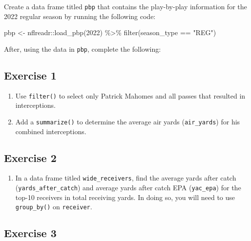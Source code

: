 \documentclass[
  letterpaper,
]{krantz}
\newenvironment{Shaded}{\begin{snugshade}}{\end{snugshade}}
\newcommand{\DecValTok}[1]{\textcolor[rgb]{0.68,0.00,0.00}{#1}}
\newcommand{\FunctionTok}[1]{\textcolor[rgb]{0.28,0.35,0.67}{#1}}
\newcommand{\NormalTok}[1]{\textcolor[rgb]{0.00,0.23,0.31}{#1}}
\newcommand{\OtherTok}[1]{\textcolor[rgb]{0.00,0.23,0.31}{#1}}
\newcommand{\SpecialCharTok}[1]{\textcolor[rgb]{0.37,0.37,0.37}{#1}}
\newcommand{\StringTok}[1]{\textcolor[rgb]{0.13,0.47,0.30}{#1}}
\providecommand{\tightlist}{%
  \setlength{\itemsep}{0pt}\setlength{\parskip}{0pt}}\usepackage{longtable,booktabs,array}
\begin{document}
Create a data frame titled \texttt{pbp} that contains the play-by-play
information for the 2022 regular season by running the following code:

\begin{Shaded}
\begin{Highlighting}[]
\NormalTok{pbp }\OtherTok{\textless{}{-}}\NormalTok{ nflreadr}\SpecialCharTok{::}\FunctionTok{load\_pbp}\NormalTok{(}\DecValTok{2022}\NormalTok{) }\SpecialCharTok{\%\textgreater{}\%}
  \FunctionTok{filter}\NormalTok{(season\_type }\SpecialCharTok{==} \StringTok{"REG"}\NormalTok{)}
\end{Highlighting}
\end{Shaded}

After, using the data in \texttt{pbp}, complete the following:

\hypertarget{exercise-1}{%
\subsection{\texorpdfstring{\textbf{Exercise
1}}{Exercise 1}}\label{exercise-1}}

\begin{enumerate}
\def\labelenumi{\arabic{enumi}.}
\tightlist
\item
  Use \texttt{filter()} to select only Patrick Mahomes and all passes
  that resulted in interceptions.
\item
  Add a \texttt{summarize()} to determine the average air yards
  (\texttt{air\_yards}) for his combined interceptions.
\end{enumerate}

\hypertarget{exercise-2}{%
\subsection{\texorpdfstring{\textbf{Exercise
2}}{Exercise 2}}\label{exercise-2}}

\begin{enumerate}
\def\labelenumi{\arabic{enumi}.}
\tightlist
\item
  In a data frame titled \texttt{wide\_receivers}, find the average
  yards after catch (\texttt{yards\_after\_catch}) and average yards
  after catch EPA (\texttt{yac\_epa}) for the top-10 receivers in total
  receiving yards. In doing so, you will need to use
  \texttt{group\_by()} on \texttt{receiver}.
\end{enumerate}

\hypertarget{exercise-3}{%
\subsection{\texorpdfstring{\textbf{Exercise
3}}{Exercise 3}}\label{exercise-3}}
\end{document}
